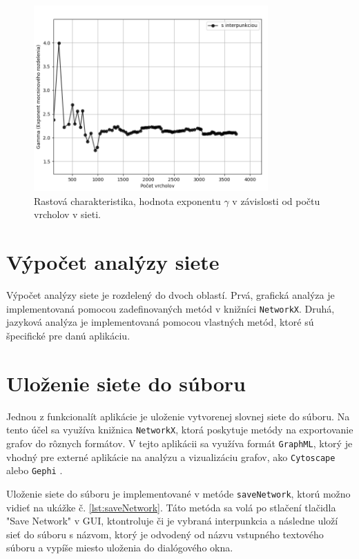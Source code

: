 \begin{figure}
    \centerline{\includegraphics[width=0.8\textwidth]{images/growthPlot.png}}
    \caption[Rastová charakteristika, hodnota exponentu $\gamma$ v závislosti od počtu vrcholov v sieti.]{Rastová charakteristika, hodnota exponentu $\gamma$ v závislosti od počtu vrcholov v sieti.}
    \label{obr:growthPlot}
\end{figure}

\section{Výpočet analýzy siete}\label{sec:calculationOfNetworkAnalysis}

Výpočet analýzy siete je rozdelený do dvoch oblastí. Prvá, grafická analýza je implementovaná pomocou zadefinovaných
metód v knižníci \texttt{NetworkX}. Druhá, jazyková analýza je implementovaná pomocou vlastných metód,
ktoré sú špecifické pre danú aplikáciu.

\section{Uloženie siete do súboru}\label{sec:savingNetworkToFile}

Jednou z funkcionalít aplikácie je uloženie vytvorenej slovnej siete do súboru. Na tento účel sa využíva knižnica \texttt{NetworkX},
ktorá poskytuje metódy na exportovanie grafov do rôznych formátov. V tejto aplikácii sa využíva formát \texttt{GraphML}, ktorý je
vhodný pre externé aplikácie na analýzu a vizualizáciu grafov, ako \texttt{Cytoscape} \cite{cytoscape_website}
alebo \texttt{Gephi} \cite{gephi_website}. 

Uloženie siete do súboru je implementované v metóde \texttt{saveNetwork}, ktorú možno
vidieť na ukážke č. \ref{lst:saveNetwork}. Táto metóda sa volá po stlačení tlačidla "Save Network" v GUI, ktontroluje či je vybraná
interpunkcia a následne uloží sieť do súboru s názvom, ktorý je odvodený od názvu vstupného textového súboru a vypíše miesto uloženia
do dialógového okna.

